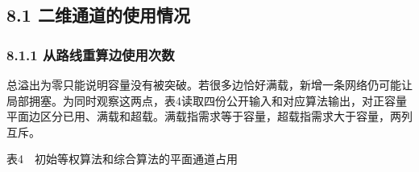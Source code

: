 \documentclass[12pt,a4paper]{article}
\begin{document}
\subsection{8.1
二维通道的使用情况}\label{ux4e8cux7ef4ux901aux9053ux7684ux4f7fux7528ux60c5ux51b5}

\subsubsection{8.1.1
从路线重算边使用次数}\label{ux4eceux8defux7ebfux91cdux7b97ux8fb9ux4f7fux7528ux6b21ux6570}

总溢出为零只能说明容量没有被突破。若很多边恰好满载，新增一条网络仍可能让局部拥塞。为同时观察这两点，表4读取四份公开输入和对应算法输出，对正容量平面边区分已用、满载和超载。满载指需求等于容量，超载指需求大于容量，两列互斥。

\begin{center}\fontsize{12}{14.4}\selectfont 表4　初始等权算法和综合算法的平面通道占用\end{center}
\end{document}
